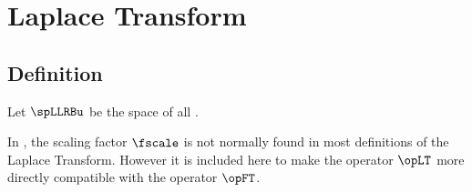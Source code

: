 \chapter{Laplace Transform}

\section{Definition}
\begin{definition}
\label{def:opLT}
Let $\spLLRBu$ be the space of all
.\\
\end{definition}

In , the scaling factor $\fscale$ is not normally found
in most definitions of the Laplace Transform.
However it is included here to make the operator $\opLT$ more directly compatible
with the  operator $\opFT$.

